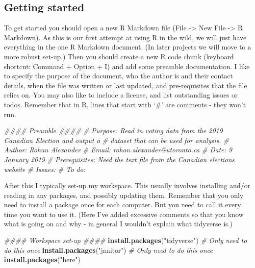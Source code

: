 \documentclass[
]{book}
\newenvironment{Shaded}{\begin{snugshade}}{\end{snugshade}}
\newcommand{\CommentTok}[1]{\textcolor[rgb]{0.56,0.35,0.01}{\textit{#1}}}
\newcommand{\KeywordTok}[1]{\textcolor[rgb]{0.13,0.29,0.53}{\textbf{#1}}}
\newcommand{\NormalTok}[1]{#1}
\newcommand{\StringTok}[1]{\textcolor[rgb]{0.31,0.60,0.02}{#1}}
\begin{document}
\hypertarget{getting-started}{%
\subsection{Getting started}\label{getting-started}}

To get started you should open a new R Markdown file (File -\textgreater{} New File -\textgreater{} R Markdown). As this is our first attempt at using R in the wild, we will just have everything in the one R Markdown document. (In later projects we will move to a more robust set-up.) Then you should create a new R code chunk (keyboard shortcut: Command + Option + I) and add some preamble documentation. I like to specify the purpose of the document, who the author is and their contact details, when the file was written or last updated, and pre-requisites that the file relies on. You may also like to include a license, and list outstanding issues or todos. Remember that in R, lines that start with `\#' are comments - they won't run.

\begin{Shaded}
\begin{Highlighting}[]
\CommentTok{#### Preamble ####}
\CommentTok{# Purpose: Read in voting data from the 2019 Canadian Election and output a }
\CommentTok{# dataset that can be used for analysis.}
\CommentTok{# Author: Rohan Alexander}
\CommentTok{# Email: rohan.alexander@utoronto.ca}
\CommentTok{# Date: 9 January 2019}
\CommentTok{# Prerequisites: Need the text file from the Canadian elections website}
\CommentTok{# Issues: }
\CommentTok{# To do:}
\end{Highlighting}
\end{Shaded}

After this I typically set-up my workspace. This usually involves installing and/or reading in any packages, and possibly updating them. Remember that you only need to install a package once for each computer. But you need to call it every time you want to use it. (Here I've added excessive comments so that you know what is going on and why - in general I wouldn't explain what tidyverse is.)

\begin{Shaded}
\begin{Highlighting}[]
\CommentTok{#### Workspace set-up ####}
\KeywordTok{install.packages}\NormalTok{(}\StringTok{"tidyverse"}\NormalTok{) }\CommentTok{# Only need to do this once}
\KeywordTok{install.packages}\NormalTok{(}\StringTok{"janitor"}\NormalTok{) }\CommentTok{# Only need to do this once}
\KeywordTok{install.packages}\NormalTok{(}\StringTok{"here"}\NormalTok{) }
\end{Highlighting}
\end{Shaded}
\end{document}
